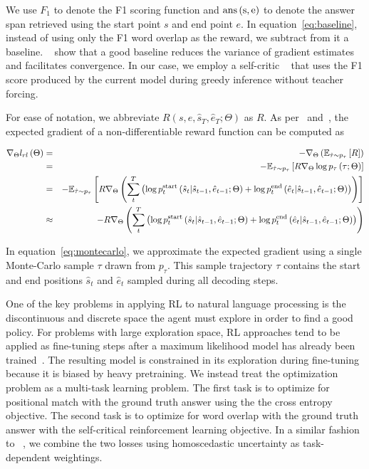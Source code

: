 \documentclass{article} %
\begin{document}
We use $F_1$ to denote the F1 scoring function and $\rm{ans}\left( {s}, {e}\right)$ to denote the answer span retrieved using the start point $s$ and end point $e$.
In equation~\ref{eq:baseline}, instead of using only the F1 word overlap as the reward, we subtract from it a baseline.
~\citet{Greensmith2001VarianceRT} show that a good baseline reduces the variance of gradient estimates and facilitates convergence.
In our case, we employ a self-critic ~\citep{Konda1999ActorCriticA} that uses the F1 score produced by the current model during greedy inference without teacher forcing.

For ease of notation, we abbreviate $R \left(s, e, \hat{s}_T, \hat{e}_T ; \Theta \right)$ as $R$.
As per~\citet{Sutton1999PolicyGM} and~\citet{Schulman2015GradientEU}, the expected gradient of a non-differentiable reward function can be computed as

\begin{eqnarray}
\nabla_\Theta l_{rl}\left(\Theta\right) &=&
- \nabla_\Theta
\left(
    \mathbb{E}_{\hat{\tau} \sim p_{\tau}}
    \left[
    R
    \right]
\right)
\\
&=&
-
\mathbb{E}_{\hat{\tau} \sim p_{\tau}}
\left[
R
\nabla_\Theta
\log p_\tau \left( \tau ; \Theta \right)
\right]
\\
&=&
-
\mathbb{E}_{\hat{\tau} \sim p_{\tau}}
\left[
R
\nabla_\Theta
\left(
    \sum_t^T
    \left(
        \log p^{\rm{start}}_t \left( \hat{s}_t \vert \hat{s}_{t-1}, \hat{e}_{t-1}; \Theta \right)
        +
        \log p^{\rm{end}}_t \left( \hat{e}_t  \vert \hat{s}_{t-1}, \hat{e}_{t-1}; \Theta \right)
    \right)
\right)
\right]
\nonumber
\\
\label{eq:montecarlo}
&\approx&
-
R
\nabla_\Theta
\left(
    \sum_t^T
    \left(
        \log p^{\rm{start}}_t \left( \hat{s}_t \vert \hat{s}_{t-1}, \hat{e}_{t-1}; \Theta \right)
        +
        \log p^{\rm{end}}_t \left( \hat{e}_t  \vert \hat{s}_{t-1}, \hat{e}_{t-1}; \Theta \right)
    \right)
\right)
\end{eqnarray}

In equation~\ref{eq:montecarlo}, we approximate the expected gradient using a single Monte-Carlo sample $\tau$ drawn from $p_\tau$.
This sample trajectory $\tau$ contains the start and end positions $\hat{s}_t$ and $\hat{e}_t$ sampled during all decoding steps.

One of the key problems in applying RL to natural language processing is the discontinuous and discrete space the agent must explore in order to find a good policy.
For problems with large exploration space, RL approaches tend to be applied as fine-tuning steps after a maximum likelihood model has already been trained~\citep{Paulus2017ADR,wu2016google}.
The resulting model is constrained in its exploration during fine-tuning because it is biased by heavy pretraining.
We instead treat the optimization problem as a multi-task learning problem.
The first task is to optimize for positional match with the ground truth answer using the the cross entropy objective.
The second task is to optimize for word overlap with the ground truth answer with the self-critical reinforcement learning objective.
In a similar fashion to ~\citet{Kendall2017MultiTaskLU}, we combine the two losses using homoscedastic uncertainty as task-dependent weightings.
\end{document}
